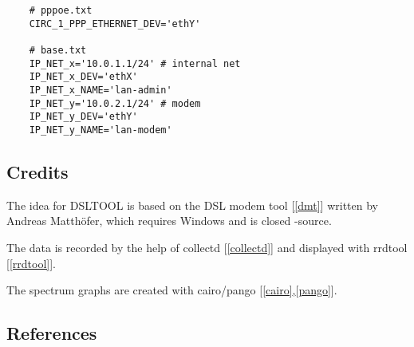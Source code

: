 
\begin{example}
\begin{verbatim}
    # pppoe.txt
    CIRC_1_PPP_ETHERNET_DEV='ethY'

    # base.txt
    IP_NET_x='10.0.1.1/24' # internal net
    IP_NET_x_DEV='ethX'
    IP_NET_x_NAME='lan-admin'
    IP_NET_y='10.0.2.1/24' # modem 
    IP_NET_y_DEV='ethY'
    IP_NET_y_NAME='lan-modem'
\end{verbatim}
\end{example}

 
\subsection{Credits}

  The idea for DSLTOOL is based on the DSL modem tool {[\ref{dmt}]} written by
  Andreas Matthöfer, which requires Windows and is closed -source.

  The data is recorded by the help of collectd {[\ref{collectd}]} and displayed with 
  rrdtool {[\ref{rrdtool}]}.
  
  The spectrum graphs are created with cairo/pango {[\ref{cairo},\ref{pango}]}.
  
\subsection{References}

\begin{list}{\textbf{[]}}{}
  
  \item \label{wiki}

  \item \label{dmt}
  
  \item \label{collectd}
  
  \item \label{rrdtool}
  
  \item \label{cairo}
  
  \item \label{pango}
  
\end{list}
